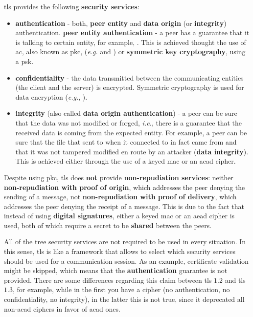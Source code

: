 \documentclass{llncs}
\begin{document}
\gls{tls} provides the following \textbf{security services}:
\begin{itemize}
\item \textbf{authentication} - both, \textbf{peer entity} and \textbf{data origin} (or \textbf{integrity})
authentication.
\subitem \textbf{peer entity authentication} - a peer has a guarantee that it is talking to certain entity, for example, .
This is achieved thought the use of \gls{ac}, also known as \gls{pkc}, (\textit{e.g.}  and )
or \textbf{symmetric key cryptography}, using a \gls{psk}.
\item \textbf{confidentiality} - the data transmitted between the communicating
entities (the client and the server) is encrypted. Symmetric cryptography is
used for data encryption (\textit{e.g.}, ).
\item \textbf{integrity} (also called \textbf{data origin authentication}) - a peer can be sure that the data was not modified or forged,
\textit{i.e.}, there is a guarantee that the received data is coming from the expected entity. For example, a peer can be sure
that the  file that sent to when it connected to  in fact
came from  and that it was not tampered modified en
route by an attacker (\textbf{data integrity}). This is achieved either through the use
of a keyed \gls{mac} or an \gls{aead} cipher.
\end{itemize}

Despite using \gls{pkc}, \gls{tls} does \textbf{not} provide \textbf{non-repudiation services}:
neither \textbf{non-repudiation with proof of origin}, which addresses the peer denying
the sending of a message, not \textbf{non-repudiation with proof of delivery}, which
addresses the peer denying the receipt of a message. This is due to the fact that
instead of using \textbf{digital signatures}, either a keyed \gls{mac} or an \gls{aead}
cipher is used, both of which require a secret to be \textbf{shared} between the peers.

All of the tree security services are not required to be used in every situation.
In this sense, \gls{tls} is like a framework that allows to select which security services should be used for a communication session. As an example,
certificate validation might be skipped, which means that the \textbf{authentication} guarantee is not provided. There are some differences regarding this claim between \gls{tls} $1.2$\cite{RFC5246}
and \gls{tls} $1.3$, for example, while in the first you have a 
cipher (no authentication, no confidentiality, no integrity), in the latter
this is not true, since it deprecated all non-\gls{aead} ciphers in favor of
\gls{aead} ones.
\end{document}
